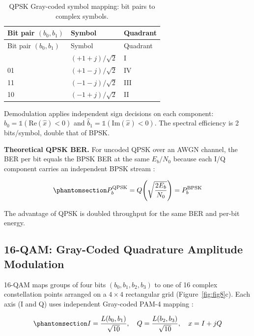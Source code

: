\begin{longtable}[]{@{}lll@{}}
\caption{QPSK Gray-coded symbol mapping: bit pairs to complex symbols.}\label{tbl:table29}\tabularnewline
\toprule\noalign{}
Bit pair \((b_0, b_1)\) & Symbol & Quadrant \\
\midrule\noalign{}
\endfirsthead
\toprule\noalign{}
Bit pair \((b_0, b_1)\) & Symbol & Quadrant \\
\midrule\noalign{}
\endhead
\bottomrule\noalign{}
\endlastfoot
00 & \((+1+j)/\sqrt{2}\) & I \\
01 & \((+1-j)/\sqrt{2}\) & IV \\
11 & \((-1-j)/\sqrt{2}\) & III \\
10 & \((-1+j)/\sqrt{2}\) & II \\
\end{longtable}

Demodulation applies independent sign decisions on each component: \(\hat{b}_0 = \mathbb{1}(\text{Re}(\hat{x}) < 0)\) and \(\hat{b}_1 = \mathbb{1}(\text{Im}(\hat{x}) < 0)\). The spectral efficiency is 2 bits/symbol, double that of BPSK.

\textbf{Theoretical QPSK BER.} For uncoded QPSK over an AWGN channel, the BER per bit equals the BPSK BER at the same \(E_b/N_0\) because each I/Q component carries an independent BPSK stream \cite{ProakisSalehi2008DigitalComm}:

\begin{equation}\protect\phantomsection\label{eq:qpsk-ber}{P_b^{\text{QPSK}} = Q\!\left(\sqrt{\frac{2E_b}{N_0}}\right) = P_b^{\text{BPSK}}
}\end{equation}

The advantage of QPSK is doubled throughput for the same BER and per-bit energy.

\subsection{16-QAM: Gray-Coded Quadrature Amplitude Modulation}\label{sec:qam-gray-coded-quadrature-amplitude-modulation}

16-QAM maps groups of four bits \((b_0, b_1, b_2, b_3)\) to one of 16 complex constellation points arranged on a \(4 \times 4\) rectangular grid (Figure~\ref{fig:fig8}c). Each axis (I and Q) uses independent Gray-coded PAM-4 mapping \cite{ProakisSalehi2008DigitalComm}:

\begin{equation}\protect\phantomsection\label{eq:qam16-mapping}{I = \frac{L(b_0, b_1)}{\sqrt{10}}, \quad Q = \frac{L(b_2, b_3)}{\sqrt{10}}, \quad x = I + jQ
}\end{equation}

